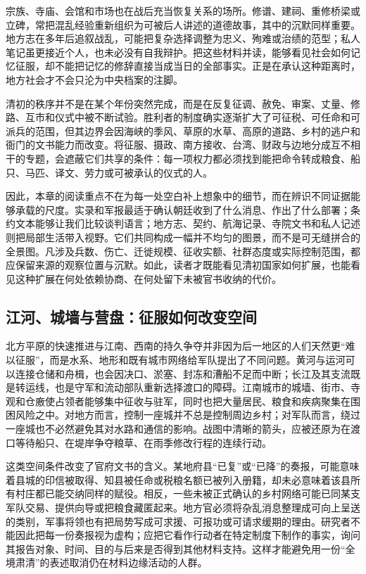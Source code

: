 宗族、寺庙、会馆和市场也在战后充当恢复关系的场所。修谱、建祠、重修桥梁或立碑，常把混乱经验重新组织为可被后人讲述的道德故事，其中的沉默同样重要。地方志在多年后追叙战乱，可能把复杂选择调整为忠义、殉难或治绩的范型；私人笔记虽更接近个人，也未必没有自我辩护。把这些材料并读，能够看见社会如何记忆征服，却不能把记忆的修辞直接当成当日的全部事实。正是在承认这种距离时，地方社会才不会只沦为中央档案的注脚。

清初的秩序并不是在某个年份突然完成，而是在反复征调、赦免、审案、丈量、修路、互市和仪式中被不断试验。胜利者的制度确实逐渐扩大了可征税、可任命和可派兵的范围，但其边界会因海峡的季风、草原的水草、高原的道路、乡村的逃户和衙门的文书能力而改变。将征服、摄政、南方接收、台湾、财政与边地分成互不相干的专题，会遮蔽它们共享的条件：每一项权力都必须找到能把命令转成粮食、船只、马匹、译文、劳力或可被承认的仪式的人。

因此，本章的阅读重点不在为每一处空白补上想象中的细节，而在辨识不同证据能够承载的尺度。实录和军报最适于确认朝廷收到了什么消息、作出了什么部署；条约文本能够让我们比较谈判语言；地方志、契约、航海记录、寺院文书和私人记述则把局部生活带入视野。它们共同构成一幅并不均匀的图景，而不是可无缝拼合的全景图。凡涉及兵数、伤亡、迁徙规模、征收实额、社群态度或实际控制范围，都应保留来源的观察位置与沉默。如此，读者才既能看见清初国家如何扩展，也能看见这种扩展在何处依赖协商、在何处留下未被官书收纳的代价。

\subsection*{江河、城墙与营盘：征服如何改变空间}
北方平原的快速推进与江南、西南的持久争夺并非因为后一地区的人们天然更“难以征服”，而是水系、地形和既有城市网络给军队提出了不同问题。黄河与运河可以连接仓储和舟楫，也会因决口、淤塞、封冻和漕船不足而中断；长江及其支流既是转运线，也是守军和流动部队重新选择渡口的障碍。江南城市的城墙、街市、寺观和仓廒使占领者能够集中征收与驻军，同时也把大量居民、粮食和疾病聚集在围困风险之中。对地方而言，控制一座城并不总是控制周边乡村；对军队而言，绕过一座城也不必然避免其对水路和通信的影响。战图中清晰的箭头，应被还原为在渡口等待船只、在堤岸争夺粮草、在雨季修改行程的连续行动。

这类空间条件改变了官府文书的含义。某地府县“已复”或“已降”的奏报，可能意味着县城的印信被取得、知县被任命或税粮名额已被列入册籍，却未必意味着该县所有村庄都已能交纳同样的赋役。相反，一些未被正式确认的乡村网络可能已同某支军队交易、提供向导或把粮食藏匿起来。地方官必须将杂乱消息整理成可向上呈送的类别，军事将领也有把局势写成可求援、可报功或可请求缓期的理由。研究者不能因此把每一份奏报视为虚构；应把它看作行动者在特定制度下制作的事实，询问其报告对象、时间、目的与后来是否得到其他材料支持。这样才能避免用一份“全境肃清”的表述取消仍在材料边缘活动的人群。

